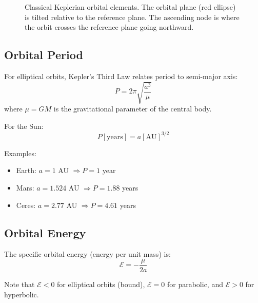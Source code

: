\begin{figure}[htbp]


\caption{Classical Keplerian orbital elements. The orbital plane (red ellipse) is tilted relative to the reference plane. The ascending node is where the orbit crosses the reference plane going northward.}
\label{fig:keplerian_elements}
\end{figure}

\subsection{Orbital Period}

For elliptical orbits, Kepler's Third Law relates period to semi-major axis:
\begin{equation}
    P = 2\pi\sqrt{\frac{a^3}{\mu}}
\end{equation}
where $\mu = GM$ is the gravitational parameter of the central body.

For the Sun:
\begin{equation}
    P[\text{years}] = a[\text{AU}]^{3/2}
\end{equation}

Examples:
\begin{itemize}
    \item Earth: $a = 1$ AU $\Rightarrow P = 1$ year
    \item Mars: $a = 1.524$ AU $\Rightarrow P = 1.88$ years
    \item Ceres: $a = 2.77$ AU $\Rightarrow P = 4.61$ years
\end{itemize}

\subsection{Orbital Energy}

The specific orbital energy (energy per unit mass) is:
\begin{equation}
    \mathcal{E} = -\frac{\mu}{2a}
\end{equation}

Note that $\mathcal{E} < 0$ for elliptical orbits (bound), $\mathcal{E} = 0$ for parabolic, and $\mathcal{E} > 0$ for hyperbolic.

